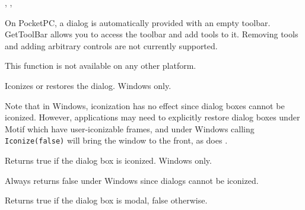
, ,\rtfsp
{}


\label{wxdialoggettoolbar}


On PocketPC, a dialog is automatically provided with an empty toolbar. GetToolBar
allows you to access the toolbar and add tools to it. Removing tools and adding
arbitrary controls are not currently supported.

This function is not available on any other platform.


\label{wxdialogiconized}


Iconizes or restores the dialog. Windows only.




Note that in Windows, iconization has no effect since dialog boxes cannot be
iconized. However, applications may need to explicitly restore dialog
boxes under Motif which have user-iconizable frames, and under Windows
calling {\tt Iconize(false)} will bring the window to the front, as does
.


\label{wxdialogisiconized}


Returns true if the dialog box is iconized. Windows only.


Always returns false under Windows since dialogs cannot be iconized.


\label{wxdialogismodal}


Returns true if the dialog box is modal, false otherwise.


\label{wxdialogonapply}


